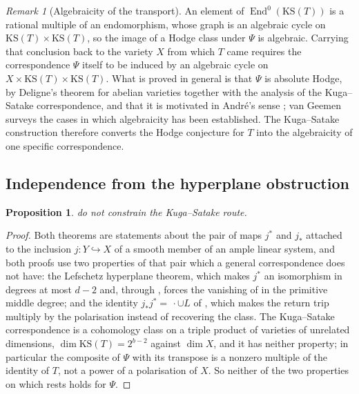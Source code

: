 \documentclass[11pt,reqno]{amsart}
\theoremstyle{plain}
\newtheorem{proposition}[theorem]{Proposition}
\theoremstyle{definition}
\theoremstyle{remark}
\newtheorem{remark}[theorem]{Remark}
\DeclareMathOperator{\End}{End}
\begin{document}
\begin{remark}[Algebraicity of the transport]%
\label{rem:kstransport}
An element of $\End^{0}(\mathrm{KS}(T))$ is a rational multiple of an
endomorphism, whose graph is an algebraic cycle on
$\mathrm{KS}(T)\times\mathrm{KS}(T)$, so the image of a Hodge class under
$\Psi$ is algebraic. Carrying that conclusion back to the variety $X$ from
which $T$ came requires the correspondence $\Psi$ itself to be induced by an
algebraic cycle on $X\times\mathrm{KS}(T)\times\mathrm{KS}(T)$. What is
proved in general is that $\Psi$ is absolute Hodge, by
Deligne's theorem for abelian varieties together with the analysis of the
Kuga--Satake correspondence, and that it is motivated in Andr\'e's sense
\cite{And96}; van Geemen \cite{vG00} surveys the cases in which algebraicity
has been established. The Kuga--Satake construction therefore converts the
Hodge conjecture for $T$ into the algebraicity of one specific
correspondence.
\end{remark}

\subsection{Independence from the hyperplane obstruction}

\begin{proposition}\label{prop:ksnotrestriction}
 do not constrain the Kuga--Satake route.
\end{proposition}

\begin{proof}
Both theorems are statements about the pair of maps $j^{*}$ and $j_{*}$
attached to the inclusion $j\colon Y\hookrightarrow X$ of a smooth member of an
ample linear system, and both proofs use two properties of that pair which a
general correspondence does not have: the Lefschetz hyperplane theorem, which
makes $j^{*}$ an isomorphism in degrees at most $d-2$ and, through
, forces the vanishing of  in
the primitive middle degree; and the identity $j_{*}j^{*}=\,\cdot\cup L$ of
, which makes the return trip multiply by the
polarisation instead of recovering the class. The Kuga--Satake
correspondence is a cohomology class on a triple product of varieties of
unrelated dimensions, $\dim\mathrm{KS}(T)=2^{b-2}$ against $\dim X$, and it has
neither property; in particular the composite of $\Psi$ with its transpose is
a nonzero multiple of the identity of $T$, not a power of a polarisation of
$X$. So
neither of the two properties on which  rests holds for
$\Psi$.
\end{proof}
\end{document}
